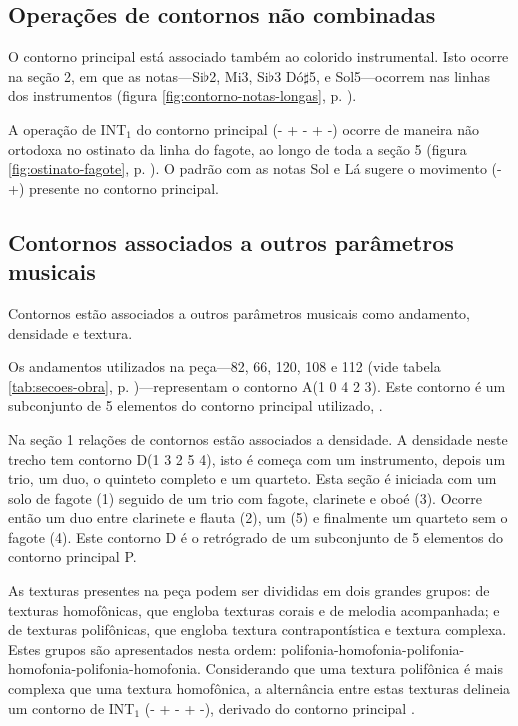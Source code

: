 \subsection{Operações de contornos não combinadas}
\label{sec:cont-nao-comb}

O contorno principal \contpr{} está associado também ao colorido
instrumental. Isto ocorre na seção 2, em que as notas---Si$\flat$2,
Mi3, Si$\flat$3 Dó$\sharp$5, e Sol5---ocorrem nas linhas dos
instrumentos (figura \ref{fig:contorno-notas-longas},
p. \pageref{fig:contorno-notas-longas}).

A operação de INT$_1$ do contorno principal (- + - + -) ocorre de
maneira não ortodoxa no ostinato da linha do fagote, ao longo de toda
a seção 5 (figura \ref{fig:ostinato-fagote},
p. \pageref{fig:ostinato-fagote}). O padrão com as notas Sol e Lá
sugere o movimento (- +) presente no contorno principal.


\subsection{Contornos associados a outros parâmetros musicais}
\label{sec:cont-assoc-outr}

Contornos estão associados a outros parâmetros musicais como
andamento, densidade e textura.

Os andamentos utilizados na peça---82, 66, 120, 108 e 112 (vide tabela
\ref{tab:secoes-obra}, p. \pageref{tab:secoes-obra})---representam o
contorno A(1 0 4 2 3). Este contorno é um subconjunto de 5 elementos
do contorno principal utilizado, \contpr{}.

Na seção 1 relações de contornos estão associados a densidade. A
densidade neste trecho tem contorno D(1 3 2 5 4), isto é começa com um
instrumento, depois um trio, um duo, o quinteto completo e um
quarteto. Esta seção é iniciada com um solo de fagote (1) seguido de
um trio com fagote, clarinete e oboé (3). Ocorre então um duo entre
clarinete e flauta (2), um  (5) e finalmente um quarteto
sem o fagote (4). Este contorno D é o retrógrado de um subconjunto de
5 elementos do contorno principal P.

As texturas presentes na peça podem ser divididas em dois grandes
grupos: de texturas homofônicas, que engloba texturas corais e de
melodia acompanhada; e de texturas polifônicas, que engloba textura
contrapontística e textura complexa. Estes grupos são apresentados
nesta ordem:
polifonia-homofonia-polifonia-homofonia-polifonia-homofonia. Considerando
que uma textura polifônica é mais complexa que uma textura homofônica,
a alternância entre estas texturas delineia um contorno de INT$_1$ (-
+ - + -), derivado do contorno principal \contpr{}.

